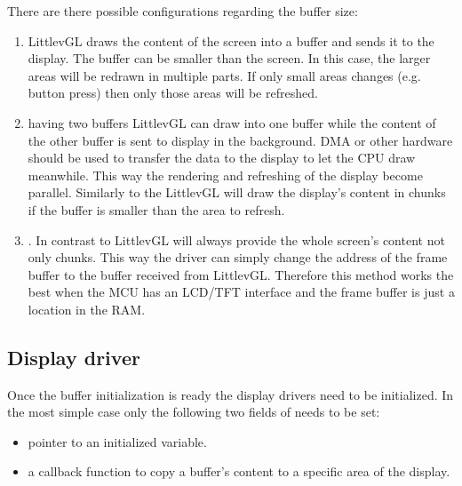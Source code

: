 \documentclass[letterpaper,10pt,english]{sphinxmanual}
\begin{document}
There are there possible configurations regarding the buffer size:
\begin{enumerate}
\def\theenumi{\arabic{enumi}}
\def\labelenumi{\theenumi .}
\makeatletter\def\p@enumii{\p@enumi \theenumi .}\makeatother
\item {} 
 LittlevGL draws the content of the screen into a buffer and sends it to the display.
The buffer can be smaller than the screen. In this case, the larger areas will be redrawn in multiple parts.
If only small areas changes (e.g. button press) then only those areas will be refreshed.

\item {} 
 having two buffers LittlevGL can draw into one buffer while the content of the other buffer is sent to display in the background.
DMA or other hardware should be used to transfer the data to the display to let the CPU draw meanwhile.
This way the rendering and refreshing of the display become parallel.
Similarly to the  LittlevGL will draw the display’s content in chunks if the buffer is smaller than the area to refresh.

\item {} 
.
In contrast to  LittlevGL will always provide the whole screen’s content not only chunks.
This way the driver can simply change the address of the frame buffer to the buffer received from LittlevGL.
Therefore this method works the best when the MCU has an LCD/TFT interface and the frame buffer is just a location in the RAM.

\end{enumerate}


\subsection{Display driver}
\label{\detokenize{porting/display:display-driver}}
Once the buffer initialization is ready the display drivers need to be initialized. In the most simple case only the following two fields of  needs to be set:
\begin{itemize}
\item {} 
 pointer to an initialized  variable.

\item {} 
 a callback function to copy a buffer’s content to a specific area of the display.

\end{itemize}
\end{document}

